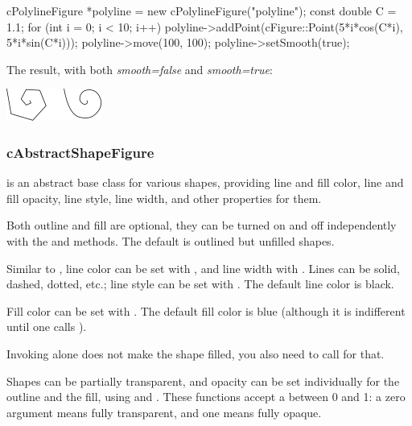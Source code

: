 \begin{cpp}
cPolylineFigure *polyline = new cPolylineFigure("polyline");
const double C = 1.1;
for (int i = 0; i < 10; i++)
    polyline->addPoint(cFigure::Point(5*i*cos(C*i), 5*i*sin(C*i)));
polyline->move(100, 100);
polyline->setSmooth(true);
\end{cpp}


The result, with both \textit{smooth=false} and \textit{smooth=true}:

\begin{center}
\includegraphics[scale=4.0]{figures/figure-polylines}
\end{center}


\subsubsection{cAbstractShapeFigure}

 is an abstract base class for various shapes,
providing line and fill color, line and fill opacity, line style, line
width, and other properties for them.

Both outline and fill are optional, they can be turned on and off
independently with the  and 
methods. The default is outlined but unfilled shapes.

Similar to , line color can be set with
, and line width with .
Lines can be solid, dashed, dotted, etc.; line style can be set with
. The default line color is black.

Fill color can be set with . The default fill color
is blue (although it is indifferent until one calls ).

\begin{note}
Invoking  alone does not make the shape filled,
you also need to call  for that.
\end{note}

Shapes can be partially transparent, and opacity can be set individually
for the outline and the fill, using  and
. These functions accept a  between 0
and 1: a zero argument means fully transparent, and one means fully opaque.

